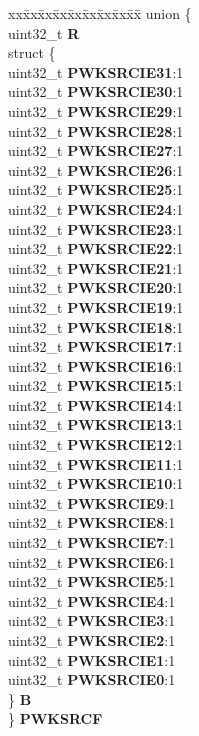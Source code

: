 \begin{DoxyCompactItemize}
\begin{tabbing}
\end{tabbing}\item 
\mbox{\label{structCRP__tag_ae5bd40a89e929bbe3c9fd20056c80b44}} 
\begin{tabbing}
xx\=xx\=xx\=xx\=xx\=xx\=xx\=xx\=xx\=\kill
union \{\\
\>uint32\_t {\bfseries R}\\
\>struct \{\\
\>\>uint32\_t {\bfseries PWKSRCIE31}:1\\
\>\>uint32\_t {\bfseries PWKSRCIE30}:1\\
\>\>uint32\_t {\bfseries PWKSRCIE29}:1\\
\>\>uint32\_t {\bfseries PWKSRCIE28}:1\\
\>\>uint32\_t {\bfseries PWKSRCIE27}:1\\
\>\>uint32\_t {\bfseries PWKSRCIE26}:1\\
\>\>uint32\_t {\bfseries PWKSRCIE25}:1\\
\>\>uint32\_t {\bfseries PWKSRCIE24}:1\\
\>\>uint32\_t {\bfseries PWKSRCIE23}:1\\
\>\>uint32\_t {\bfseries PWKSRCIE22}:1\\
\>\>uint32\_t {\bfseries PWKSRCIE21}:1\\
\>\>uint32\_t {\bfseries PWKSRCIE20}:1\\
\>\>uint32\_t {\bfseries PWKSRCIE19}:1\\
\>\>uint32\_t {\bfseries PWKSRCIE18}:1\\
\>\>uint32\_t {\bfseries PWKSRCIE17}:1\\
\>\>uint32\_t {\bfseries PWKSRCIE16}:1\\
\>\>uint32\_t {\bfseries PWKSRCIE15}:1\\
\>\>uint32\_t {\bfseries PWKSRCIE14}:1\\
\>\>uint32\_t {\bfseries PWKSRCIE13}:1\\
\>\>uint32\_t {\bfseries PWKSRCIE12}:1\\
\>\>uint32\_t {\bfseries PWKSRCIE11}:1\\
\>\>uint32\_t {\bfseries PWKSRCIE10}:1\\
\>\>uint32\_t {\bfseries PWKSRCIE9}:1\\
\>\>uint32\_t {\bfseries PWKSRCIE8}:1\\
\>\>uint32\_t {\bfseries PWKSRCIE7}:1\\
\>\>uint32\_t {\bfseries PWKSRCIE6}:1\\
\>\>uint32\_t {\bfseries PWKSRCIE5}:1\\
\>\>uint32\_t {\bfseries PWKSRCIE4}:1\\
\>\>uint32\_t {\bfseries PWKSRCIE3}:1\\
\>\>uint32\_t {\bfseries PWKSRCIE2}:1\\
\>\>uint32\_t {\bfseries PWKSRCIE1}:1\\
\>\>uint32\_t {\bfseries PWKSRCIE0}:1\\
\>\} {\bfseries B}\\
\} {\bfseries PWKSRCF}\\


\end{tabbing}
\end{DoxyCompactItemize}
